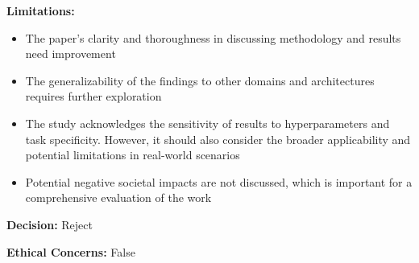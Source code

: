 \begin{tcolorbox}[colback=blue!5!white, colframe=blue!75!black, ]
\textbf{Limitations:}
\begin{itemize}
    \item The paper's clarity and thoroughness in discussing methodology and results need improvement
    \item The generalizability of the findings to other domains and architectures requires further exploration
    \item The study acknowledges the sensitivity of results to hyperparameters and task specificity. However, it should also consider the broader applicability and potential limitations in real-world scenarios
    \item Potential negative societal impacts are not discussed, which is important for a comprehensive evaluation of the work
\end{itemize}

\textbf{Decision:} Reject

\textbf{Ethical Concerns:} False
\end{tcolorbox}

